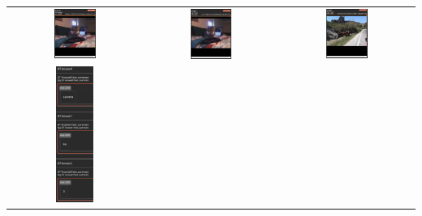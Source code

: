 \documentclass{article}
\begin{document}
\begin{tabular}{ccc}
    \includegraphics[width=0.33\textwidth]{q2.6_11.png} &
    \includegraphics[width=0.33\textwidth]{q2.6_12.png} &
    \includegraphics[width=0.33\textwidth]{q2.6_13.png} \\
    \includegraphics[width=0.3\textwidth]{q2.6_14.png} &

\end{tabular}
\end{document}
